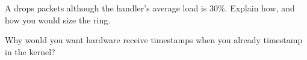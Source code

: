 \begin{interviewq}\label{iq:nw:network-cards-and-kernel-bypass:5}
A  drops packets although the handler's average load is 30\%. Explain how, and how you would size the ring.
\end{interviewq}

\begin{interviewq}\label{iq:nw:network-cards-and-kernel-bypass:6}
Why would you want hardware receive timestamps when you already timestamp in the kernel?
\end{interviewq}
